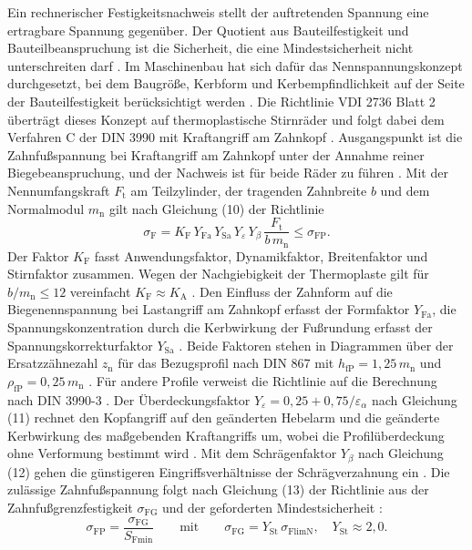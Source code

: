 Ein rechnerischer Festigkeitsnachweis stellt der auftretenden Spannung eine ertragbare Spannung gegenüber. Der Quotient aus Bauteilfestigkeit und Bauteilbeanspruchung ist die Sicherheit, die eine Mindestsicherheit nicht unterschreiten darf \cite[S.~58]{Nie19}. Im Maschinenbau hat sich dafür das Nennspannungskonzept durchgesetzt, bei dem Baugröße, Kerbform und Kerbempfindlichkeit auf der Seite der Bauteilfestigkeit berücksichtigt werden \cite[S.~58]{Nie19}. Die Richtlinie VDI 2736 Blatt 2 überträgt dieses Konzept auf thermoplastische Stirnräder und folgt dabei dem Verfahren C der DIN 3990 mit Kraftangriff am Zahnkopf \cite[S.~36]{Has18}. Ausgangspunkt ist die Zahnfußspannung bei Kraftangriff am Zahnkopf unter der Annahme reiner Biegebeanspruchung, und der Nachweis ist für beide Räder zu führen \cite[S.~11]{VDI2736-2}. Mit der Nennumfangskraft $F_{\mathrm{t}}$ am Teilzylinder, der tragenden Zahnbreite $b$ und dem Normalmodul $m_{\mathrm{n}}$ gilt nach Gleichung (10) der Richtlinie \cite[S.~11]{VDI2736-2}
\begin{equation}
    \sigma_{\mathrm{F}} = K_{\mathrm{F}}\,Y_{\mathrm{Fa}}\,Y_{\mathrm{Sa}}\,Y_{\varepsilon}\,Y_{\beta}\,\frac{F_{\mathrm{t}}}{b\,m_{\mathrm{n}}} \leq \sigma_{\mathrm{FP}} .
    \label{eq:sigma_f_vdi}
\end{equation}
Der Faktor $K_{\mathrm{F}}$ fasst Anwendungsfaktor, Dynamikfaktor, Breitenfaktor und Stirnfaktor zusammen. Wegen der Nachgiebigkeit der Thermoplaste gilt für $b/m_{\mathrm{n}} \leq 12$ vereinfacht $K_{\mathrm{F}} \approx K_{\mathrm{A}}$ \cite[S.~11]{VDI2736-2}. Den Einfluss der Zahnform auf die Biegenennspannung bei Lastangriff am Zahnkopf erfasst der Formfaktor $Y_{\mathrm{Fa}}$, die Spannungskonzentration durch die Kerbwirkung der Fußrundung erfasst der Spannungskorrekturfaktor $Y_{\mathrm{Sa}}$ \cite[S.~11 bis 12]{VDI2736-2}. Beide Faktoren stehen in Diagrammen über der Ersatzzähnezahl $z_{\mathrm{n}}$ für das Bezugsprofil nach DIN 867 mit $h_{\mathrm{fP}} = 1{,}25\,m_{\mathrm{n}}$ und $\rho_{\mathrm{fP}} = 0{,}25\,m_{\mathrm{n}}$ \cite[S.~12 bis 13]{VDI2736-2}. Für andere Profile verweist die Richtlinie auf die Berechnung nach DIN 3990-3 \cite[S.~12 bis 13]{VDI2736-2}. Der Überdeckungsfaktor $Y_{\varepsilon} = 0{,}25 + 0{,}75/\varepsilon_{\alpha}$ nach Gleichung (11) rechnet den Kopfangriff auf den geänderten Hebelarm und die geänderte Kerbwirkung des maßgebenden Kraftangriffs um, wobei die Profilüberdeckung ohne Verformung bestimmt wird \cite[S.~13]{VDI2736-2}. Mit dem Schrägenfaktor $Y_{\beta}$ nach Gleichung (12) gehen die günstigeren Eingriffsverhältnisse der Schrägverzahnung ein \cite[S.~13]{VDI2736-2}. Die zulässige Zahnfußspannung folgt nach Gleichung (13) der Richtlinie aus der Zahnfußgrenzfestigkeit $\sigma_{\mathrm{FG}}$ und der geforderten Mindestsicherheit \cite[S.~13]{VDI2736-2}:
\begin{equation}
    \sigma_{\mathrm{FP}} = \frac{\sigma_{\mathrm{FG}}}{S_{\mathrm{Fmin}}} \qquad \text{mit} \qquad \sigma_{\mathrm{FG}} = Y_{\mathrm{St}}\,\sigma_{\mathrm{FlimN}} , \quad Y_{\mathrm{St}} \approx 2{,}0 .
    \label{eq:sigma_fp_vdi}
\end{equation}


